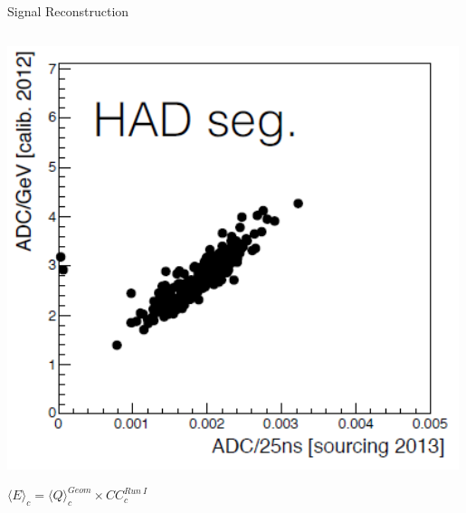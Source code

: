\documentclass[pdf, 9pt]{beamer}
\begin{document}
\begin{frame}{Signal Reconstruction}
\begin{columns}[T]
\begin{column}{0.3\textwidth}
        \includegraphics[width=0.99\textwidth, height=0.3\textheight]{figs/sourcing/2013/QIE_Res_H.png}\\
        \begin{center}
          \vspace{0.3cm}
          \tiny
          ${\langle{E}\rangle}_{c} = {\langle{Q}\rangle}^{Geom}_{c} \times {CC^{Run\ I}_{c}}$
        \end{center}
      \end{column}
    \end{columns}
  \end{frame}
\end{document}
